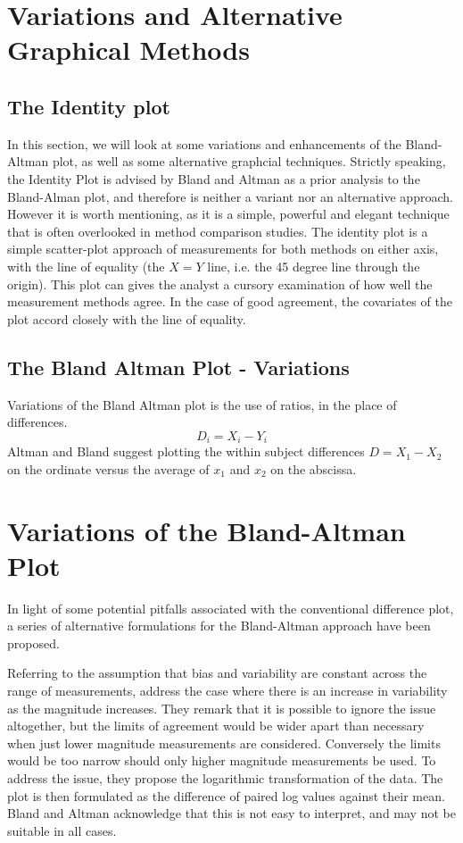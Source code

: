\documentclass[Main.tex]{subfiles}
\begin{document}
\section{Variations and Alternative Graphical Methods}

\subsection{The Identity plot}
In this section, we will look at some variations and enhancements of the Bland-Altman plot, as well as some alternative graphcial techniques. Strictly speaking, the Identity Plot is advised by Bland and Altman as a prior analysis to the Bland-Alman plot, and therefore is neither a variant nor an alternative approach. However it is worth mentioning, as it is a simple, powerful and elegant technique that is often overlooked in method comparison studies. The identity plot is a simple scatter-plot approach of measurements for both methods on either axis, with the line of equality (the $X=Y$ line, i.e. the 45 degree line through the origin). This plot can gives the analyst a cursory examination of how well the measurement methods agree. In the case of good agreement, the covariates of the plot accord closely with the line of equality.

	\subsection{The Bland Altman Plot - Variations}
	Variations of the Bland Altman plot is the use of ratios, in the
	place of differences.
	\begin{equation}
	D_{i} = X_{i} - Y_{i}   \label{BA01}
	\end{equation}
	Altman and Bland suggest plotting the within subject differences $
	D = X_{1} - X_{2} $ on the ordinate versus the average of $x_{1}$
	and  $x_{2}$ on the abscissa.



\section{Variations of the Bland-Altman Plot} 
In light of some potential pitfalls associated with the conventional difference plot, a series of alternative formulations for the Bland-Altman approach have been proposed.

Referring to the assumption that bias and variability are constant across the range
of measurements, \citet{BA99} address the case where there is an increase in variability as the magnitude increases. They remark 	that it is possible to ignore the issue altogether, but the limits of agreement would be wider apart than necessary when just lower magnitude measurements are considered. Conversely the limits would be too narrow should only higher magnitude measurements be used. To address the issue, they propose the logarithmic transformation of the data. The plot is then formulated as the difference of paired log values against their mean. Bland and Altman acknowledge that this is not easy to interpret, and may not be suitable in all cases.
\end{document}
